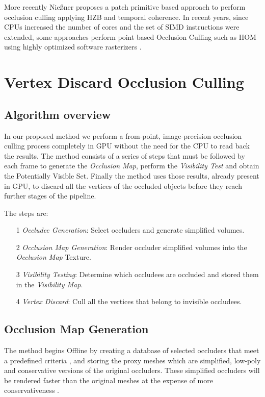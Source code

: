 \documentclass[10pt, conference]{IEEEtran}
\begin{document}
More recently Nie{\ss}ner \cite{occlusion_culling_tessellation} proposes a patch primitive based approach to perform occlusion culling applying HZB and temporal coherence. 
In recent years, since CPUs increased the number of cores and the set of SIMD instructions were extended, some approaches perform point based Occlusion Culling such as HOM using highly optimized software rasterizers \cite{killzone_3, frostbite, intel_sw_occ_cull, cacic_occlusion_2}.


\section{Vertex Discard Occlusion Culling}
%

\subsection{Algorithm overview}
%
In our proposed method we perform a from-point, image-precision \cite{survey_visibility} occlusion culling process completely in GPU without the need for the CPU to read back the results. 
The method consists of a series of steps that must be followed by each frame to generate the \emph{Occlusion Map}, perform the \emph{Visibility Test} and obtain the Potentially Visible Set. Finally the method uses those results, already present in GPU, to discard all the vertices of the occluded objects before they reach further stages of the pipeline.\

The steps are:
\begin{itemize}
	\item[1] \emph{Occludee Generation}: Select occluders and generate simplified volumes.
	\item[2] \emph{Occlusion Map Generation}: Render occluder simplified volumes into the  \emph{Occlusion Map} Texture.
	\item[3] \emph{Visibility Testing}: Determine which occludees are occluded and stored them in the  \emph{Visibility Map}.
	\item[4] \emph{Vertex Discard}: Cull all the vertices that belong to invisible occludees.
\end{itemize}


\subsection{Occlusion Map Generation}
%
The method begins Offline by creating a database of selected occluders that meet a predefined criteria \cite{cacic_occlusion_1}, 
and storing the proxy meshes which are simplified, low-poly and conservative versions of the original occluders. 
These simplified occluders will be rendered faster than the original meshes at the expense of more conservativeness .\
\end{document}

